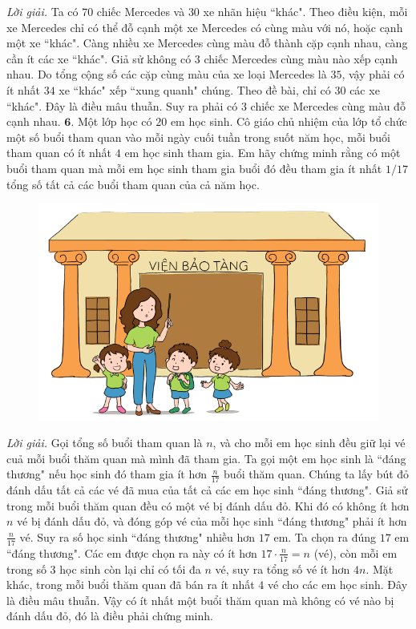 \begin{multicols}{2}
\begin{figure}[H]
		\vspace*{-10pt}
	\end{figure}
	\textit{Lời giải.} Ta có $70$ chiếc Mercedes và $30$ xe nhãn hiệu ``khác". Theo điều kiện, mỗi xe Mercedes chỉ có thể đỗ cạnh một xe Mercedes có cùng màu với nó, hoặc cạnh một xe ``khác". Càng nhiều xe Mercedes cùng màu đỗ thành cặp cạnh nhau, càng cần ít các xe ``khác".
	\vskip 0.1cm
	Giả sử không có $3$ chiếc Mercedes cùng màu nào xếp cạnh nhau. Do tổng cộng số các cặp cùng màu của xe loại Mercedes là $35$, vậy phải có ít nhất $34$ xe ``khác" xếp ``xung quanh" chúng. Theo đề bài, chỉ có $30$ các xe ``khác". Đây là điều mâu thuẫn.
	\vskip 0.1cm
	Suy ra phải có $3$ chiếc xe Mercedes cùng màu đỗ cạnh nhau.
	\vskip 0.1cm
	$\pmb{6.}$ Một lớp học có $20$ em học sinh. Cô giáo chủ nhiệm của lớp tổ chức một số buổi tham quan vào mỗi ngày cuối tuần trong suốt năm học, mỗi buổi tham quan có ít nhất $4$ em học sinh tham gia. Em hãy chứng minh rằng có một buổi tham quan mà mỗi em học sinh tham gia buổi đó đều tham gia ít nhất $1/17$ tổng số tất cả các buổi tham quan của cả năm học.
	\begin{figure}[H]
		\centering
		\vspace*{-15pt}
		\captionsetup{labelformat= empty, justification=centering}
		\includegraphics[width=0.85\linewidth]{Pi5_bai6}
		\vspace*{-10pt}
	\end{figure}
	\textit{Lời giải.}	Gọi tổng số buổi tham quan là $n$, và cho mỗi em học sinh đều giữ lại vé cuả mỗi buổi thăm quan mà mình đã tham gia. Ta gọi một em học sinh là ``đáng thương"  nếu học sinh đó tham gia ít hơn $\frac{n}{17}$ buổi thăm quan. Chúng ta lấy bút đỏ đánh dấu tất cả các vé đã mua của tất cả các em học sinh ``đáng thương". 
	\vskip 0.1cm
	Giả sử trong mỗi buổi thăm quan đều có một vé bị đánh dấu đỏ. Khi đó có không ít hơn $n$ vé bị đánh dấu đỏ, và đóng góp vé của mỗi học sinh ``đáng thương" phải ít hơn $\frac{n}{17}$ vé. Suy ra số học sinh ``đáng thương" nhiều hơn $17$ em.
	\vskip 0.1cm
	Ta chọn ra đúng $17$ em  ``đáng thương".  Các em được chọn ra này có ít hơn $17\cdot \frac{n}{17}= n$  (vé), còn mỗi em trong số $3$ học sinh còn lại chỉ có tối đa $n$ vé, suy ra tổng số vé ít hơn $4n$. Mặt khác, trong mỗi buổi thăm quan đã bán ra ít nhất $4$ vé cho các em học sinh. Đây là điều mâu thuẫn.
	\vskip 0.1cm
	Vậy có ít nhất một buổi thăm quan mà không có vé nào bị đánh dấu đỏ, đó là điều phải chứng minh.
\end{multicols}
